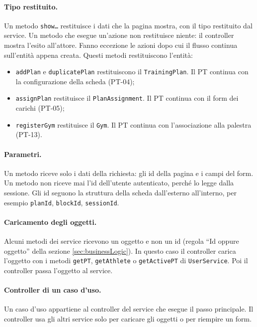 \paragraph{Tipo restituito.} Un metodo \texttt{show\ldots} restituisce i
dati che la pagina mostra, con il tipo restituito dal service. Un metodo
che esegue un'azione non restituisce niente: il controller mostra
l'esito all'attore. Fanno eccezione le azioni dopo cui il flusso
continua sull'entità appena creata. Questi metodi restituiscono
l'entità:
\begin{itemize}
  \item \texttt{addPlan} e \texttt{duplicatePlan} restituiscono il
    \texttt{TrainingPlan}. Il PT continua con la configurazione della
    scheda (PT-04);
  \item \texttt{assignPlan} restituisce il \texttt{PlanAssignment}. Il
    PT continua con il form dei carichi (PT-05);
  \item \texttt{registerGym} restituisce il \texttt{Gym}. Il PT
    continua con l'associazione alla palestra (PT-13).
\end{itemize}

\paragraph{Parametri.} Un metodo riceve solo i dati della richiesta:
gli id della pagina e i campi del form. Un metodo non riceve mai l'id
dell'utente autenticato, perché lo legge dalla sessione. Gli id seguono
la struttura della scheda dall'esterno all'interno, per esempio
\texttt{planId}, \texttt{blockId}, \texttt{sessionId}.

\paragraph{Caricamento degli oggetti.} Alcuni metodi dei service
ricevono un oggetto e non un id (regola \enquote{Id oppure oggetto}
della sezione \ref{sec:businessLogic}). In questo caso il controller
carica l'oggetto con i metodi \texttt{getPT}, \texttt{getAthlete} o
\texttt{getActivePT} di \texttt{UserService}. Poi il controller passa
l'oggetto al service.

\paragraph{Controller di un caso d'uso.} Un caso d'uso appartiene al
controller del service che esegue il passo principale. Il controller
usa gli altri service solo per caricare gli oggetti o per riempire un
form.

